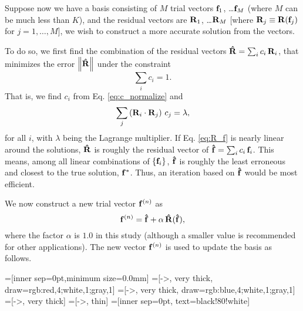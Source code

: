 \documentclass[reprint,aip,jcp,superscriptaddress]{revtex4-1}
\begin{document}
Suppose now we have a basis consisting of $M$ trial vectors
$\mathbf{f}_1$, \dots $\mathbf{f}_M$
(where $M$ can be much less than $K$),
%
and the residual vectors are
$\mathbf{R}_1$, \dots $\mathbf{R}_M$
[where $\mathbf{R}_j \equiv \mathbf{R}(\mathbf{f}_j)$
for $j = 1, \dots, M$],
%
we wish to construct a more accurate solution
from the vectors.



To do so, we first find the combination of the residual vectors
$\mathbf{\hat R} = \sum_i c_i \, \mathbf{R}_i$,
that minimizes the error
$\left\| \mathbf{\hat R} \right\|$
under the constraint
\begin{equation}
  \sum_i c_i = 1.
  \label{eq:c_normalize}
\end{equation}
%
That is,
we find $c_i$ from Eq. \eqref{eq:c_normalize} and
\begin{equation*}
  \sum_j \left( \mathbf{R}_i \cdot \mathbf{R}_j \right) \, c_j = \lambda,
\end{equation*}
for all $i$,
with $\lambda$ being the Lagrange multiplier.
%
If Eq. \eqref{eq:R_f} is nearly linear
around the solutions,
%
$\mathbf{\hat R}$
is roughly the residual vector of
$\mathbf{\hat f} = \sum_i c_i \, \mathbf{f}_i$.
%
This means,
among all linear combinations of
$\{ \mathbf{f}_i \}$,
$\mathbf{\hat f}$
is roughly the least erroneous
and closest to the true solution,
$\mathbf{f}^*$.
%
Thus,
an iteration based on
$\mathbf{\hat f}$
would be most efficient.



We now construct a new trial vector $\mathbf{f}^{(n)}$ as
%
\begin{equation}
\mathbf{f}^{(n)}
=
\mathbf{\hat f}
+
\alpha \, \mathbf{\hat R}( \mathbf{\hat f} ),
\end{equation}
%
where the factor $\alpha$ is $1.0$ in this study
(although a smaller value is recommended
for other applications\cite{kovalenko1999, howard2011}).
%
The new vector $\mathbf{f}^{(n)}$
is used to update the basis as follows.





=[inner sep=0pt,minimum size=0.0mm]
=[->, very thick, draw={rgb:red,4;white,1;gray,1}]
=[->, very thick, draw={rgb:blue,4;white,1;gray,1}]
=[->, very thick]
=[->, thin]
=[inner sep=0pt, text=black!80!white]
\end{document}
